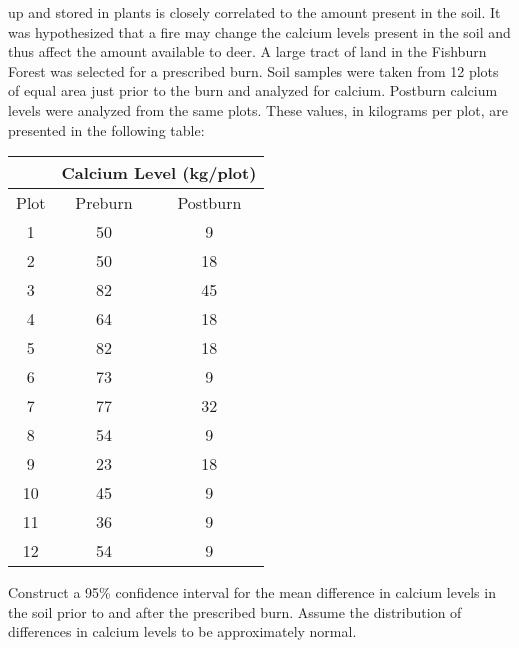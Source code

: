 \documentclass{article}
\begin{document}
up and stored in plants is closely correlated to the amount 
present in the soil. It was hypothesized that a fire may 
change the calcium levels present in the soil and thus 
affect the amount available to deer. A large tract of land 
in the Fishburn Forest was selected for a prescribed burn. 
Soil samples were taken from 12 plots of equal area just 
prior to the burn and analyzed for calcium. Postburn 
calcium levels were analyzed from the same plots. These 
values, in kilograms per plot, are presented in the 
following table:
\begin{center}
\begin{tabular}{c c c}
    & \multicolumn{2}{c}{Calcium Level (kg/plot)}\\
    \hline
    Plot & Preburn & Postburn \\
    \hline
    1  & 50 & 9  \\
    2  & 50 & 18 \\
    3  & 82 & 45 \\
    4  & 64 & 18 \\
    5  & 82 & 18 \\
    6  & 73 & 9  \\
    7  & 77 & 32 \\
    8  & 54 & 9  \\
    9  & 23 & 18 \\
    10 & 45 & 9  \\
    11 & 36 & 9  \\
    12 & 54 & 9  \\
\end{tabular}
\end{center}
Construct a 95\% confidence interval for the mean 
difference in calcium levels in the soil prior to and 
after the prescribed burn. Assume the distribution of 
differences in calcium levels to be approximately normal.
\\\newline
\end{document}
